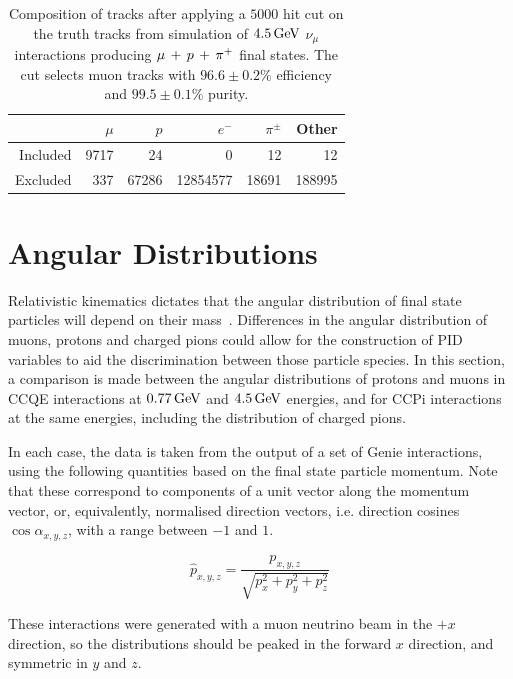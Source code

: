 \begin{table}
\centering
\begin{tabular}{*{6}{r}}
 & $\mu$ & $p$ & $e^-$ & $\pi^\pm$ & Other \\
\hline
\hline
Included & 9717 & 24 & 0 & 12 & 12 \\
Excluded & 337 & 67286 & 12854577 & 18691 & 188995 \\
\hline
\end{tabular}
\caption[Composition of tracks after $5000$ hit cut on $4.5\GeV$ \acs{CCPi} events]{\label{table:cut-results-ccpi-4.5}Composition of tracks after applying a $5000$ hit cut on the truth tracks from simulation of $4.5\GeV$ $\nu_\mu$ interactions producing $\mu\,+\,p\,+\,\pi^{+}$ final states. The cut selects muon tracks with $96.6\pm0.2\%$ efficiency and $99.5\pm0.1\%$ purity.}
\end{table}

\clearpage

\section{Angular Distributions}
Relativistic kinematics dictates that the angular distribution of final state particles will depend on their mass~\citep{PDG2012}. Differences in the angular distribution of muons, protons and charged pions could allow for the construction of PID variables to aid the discrimination between those particle species. In this section, a comparison is made between the angular distributions of protons and muons in \acs{CCQE} interactions at $0.77\,\mathrm{GeV}$ and $4.5\GeV$ energies, and for \acs{CCPi} interactions at the same energies, including the distribution of charged pions.

In each case, the data is taken from the output of a set of Genie interactions, using the following quantities based on the final state particle momentum. Note that these correspond to components of a unit vector along the momentum vector, or, equivalently, normalised direction vectors, i.e. direction cosines $\cos\alpha_{x,y,z}$, with a range between $-1$ and $1$.

\begin{equation}\label{eqn:angular_variables}
    \hat{p}_{x,y,z} = \frac{p_{x,y,z}}{\sqrt{p_x^2 + p_y^2 + p_z^2}}
\end{equation}

These interactions were generated with a muon neutrino beam in the $+x$ direction, so the distributions should be peaked in the forward $x$ direction, and symmetric in $y$ and $z$.

